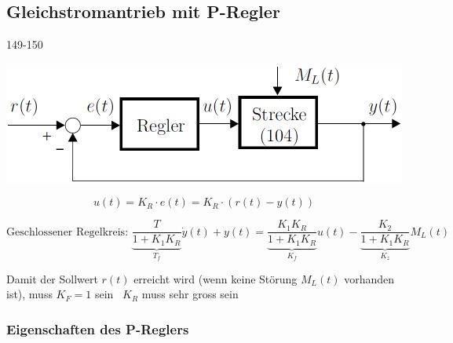 \subsection{Gleichstromantrieb mit P-Regler}{149-150}
\label{P-Regler}

\begin{minipage}[c]{0.4\columnwidth}
    \includegraphics[width=\columnwidth]{images/gleichstromantrieb_p-regler.png}
\end{minipage}
\hfill
\begin{minipage}[c]{0.48\columnwidth}
    $$ u(t) = K_R \cdot e(t) = K_R \cdot ( r(t) - y(t) )$$
\end{minipage}

$$ \boxed{ \text{Geschlossener Regelkreis: } \underbrace{\frac{T}{1 + K_1 K_R}}_{T_f} \dot{y}(t) + y(t) = \underbrace{\frac{K_1 K_R}{1 + K_1 K_R}}_{K_f} u(t)
    - \underbrace{\frac{K_2}{1 + K_1 K_R}}_{K_z} M_L(t) } $$

Damit der Sollwert $r(t)$ erreicht wird (wenn keine Störung $M_L(t)$ vorhanden ist), muss $K_F = 1$ sein
\textrightarrow\ $K_R$ muss sehr gross sein


\subsubsection{Eigenschaften des P-Reglers}

